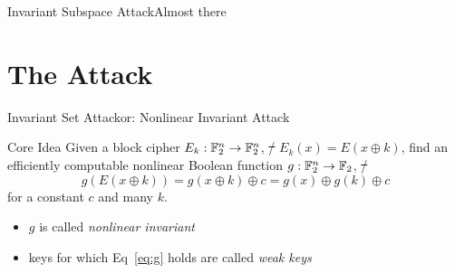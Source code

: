 \begin{frame}{Invariant Subspace Attack}{Almost there}
{    }
\end{frame}

\section{The Attack}
\begin{frame}{Invariant Set Attack}{or: Nonlinear Invariant Attack}
    \begin{block}{Core Idea}
        Given a block cipher $E_k : \mathbb{F}_2^n \to \mathbb{F}_2^n$, \st/ $E_k(x) = E(x \oplus k)$, find an efficiently computable nonlinear Boolean function $g : \mathbb{F}_2^n \to \mathbb{F}_2$, \st/
        \begin{equation}
            g(E(x \oplus k)) = g(x \oplus k) \oplus c = g(x) \oplus g(k) \oplus c
            \label{eq:g}
        \end{equation}
        for a constant $c$ and many $k$.
    \end{block}
    \begin{itemize}
        \item $g$ is called \emph{nonlinear invariant}
        \item keys for which Eq~\eqref{eq:g} holds are called \emph{weak keys}
    \end{itemize}
\end{frame}

